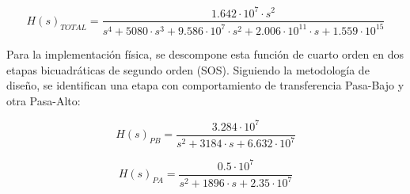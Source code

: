 $$H(s)_{TOTAL} = \frac{1.642 \cdot 10^7 \cdot s^2}{s^4 + 5080 \cdot s^3 + 
9.586 \cdot 10^7 \cdot s^2 + 2.006 \cdot 10^11 \cdot s + 1.559 \cdot 
10^15}$$

Para la implementación física, se descompone esta función de cuarto orden en 
dos etapas bicuadráticas de segundo orden (SOS). Siguiendo la metodología de 
diseño, se identifican una etapa con comportamiento de transferencia 
Pasa-Bajo y otra Pasa-Alto:

$$H(s)_{PB} = \frac{3.284 \cdot 10^7}{s^2 + 3184 \cdot s + 6.632 \cdot 10^7}$$

$$H(s)_{PA} = \frac{0.5 \cdot 10^7}{s^2 + 1896 \cdot s + 2.35 \cdot 10^7}$$



